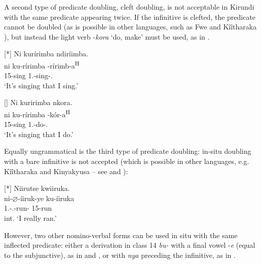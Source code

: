 \documentclass[output=paper]{langscibook}
\begin{document}
A second type of predicate doubling, cleft doubling, is not acceptable in Kirundi with the same predicate appearing twice. If the infinitive is clefted, the predicate cannot be doubled (as is possible in other languages, such as Fwe \citep{Gunnink2018} and Kîîtharaka \citep{chapters/kiitharaka}), but instead the light verb -\textit{kora} ‘do, make’ must be used, as in .

\ea
\label{bkm:Ref116983834}
\ea
[*]{
\label{bkm:Ref116983834:a}
Ni kurírimba ndiríimba.\\
\gll
ni  ku-rírimba  \N{}-rírimb-a\textsuperscript{H}\\
\COP{}  15-sing  1\SG.\SM{}-sing-\FV.\REL{}\\
\glt
‘It’s singing that I sing.’\\
}

\ex
[]{
\label{bkm:Ref116983834:b}
Ni kuririmba nkora.\\
\gll
ni  ku-rírimba  \N{}-kór-a\textsuperscript{H}\\
\COP{}  15-sing  1\SG{}.\SM{}-do-\FV.\REL{}\\
\glt
‘It’s singing that I do.’\\
}

\z
\z

Equally ungrammatical is the third type of predicate doubling: in-situ doubling with a bare infinitive is not accepted (which is possible in other languages, e.g. Kîîtharaka and Kinyakyusa – see \textcite{chapters/kiitharaka} and \textcite{chapters/kinyakyusa}):

\ea
[*]{
Niirutse kwiiruka.\\
\gll
ni-$\varnothing$-íiruk-ye  ku-íiruka\\
1\SG.\SM-\PRS.\CJ-{}run-\PFV{}  15-run\\
\glt
int. ‘I really ran.’\\
}

\z

However, two other nomino-verbal forms can be used in situ with the same inflected predicate: either a derivation in class 14 \textit{bu-} with a final vowel -\textit{e} (equal to the subjunctive), as in  and , or with \textit{nya} preceding the infinitive, as in .
\end{document}

